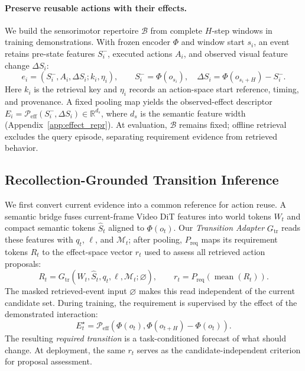 \paragraph{Preserve reusable actions with their effects.}
We build the sensorimotor repertoire $\mathcal B$ from complete $H$-step windows in training demonstrations.
With frozen encoder $\Phi$ and window start $s_i$, an event retains pre-state features $S_i^-$, executed actions $A_i$, and observed visual feature change $\Delta S_i$:
\begin{equation}
 e_i=(S_i^-,A_i,\Delta S_i;k_i,\eta_i),\qquad
 S_i^-=\Phi(o_{s_i}),\quad
 \Delta S_i=\Phi(o_{s_i+H})-S_i^- .
 \label{eq:bank}
\end{equation}
Here $k_i$ is the retrieval key and $\eta_i$ records an action-space start reference, timing, and provenance.
A fixed pooling map yields the observed-effect descriptor $E_i=\mathcal P_{\mathrm{eff}}(S_i^-,\Delta S_i)\in\mathbb R^{d_s}$, where $d_s$ is the semantic feature width (Appendix~\ref{app:effect_repr}).
At evaluation, $\mathcal B$ remains fixed; offline retrieval excludes the query episode, separating requirement evidence from retrieved behavior.

\subsection{Recollection-Grounded Transition Inference}
\label{sec:requirement}

We first convert current evidence into a common reference for action reuse.
A semantic bridge fuses current-frame Video DiT features into world tokens $W_t$ and compact semantic tokens $\widehat S_t$ aligned to $\Phi(o_t)$.
Our \emph{Transition Adapter} $G_{\mathrm{tr}}$ reads these features with $q_t$, $\ell$, and $\mathcal M_t$; after pooling, $P_{\mathrm{req}}$ maps its requirement tokens $R_t$ to the effect-space vector $r_t$ used to assess all retrieved action proposals:
\begin{equation}
 R_t=G_{\mathrm{tr}}(W_t,\widehat S_t,q_t,\ell,\mathcal M_t;\varnothing),
 \qquad r_t=P_{\mathrm{req}}\!\left(\operatorname{mean}(R_t)\right).
 \label{eq:required}
\end{equation}
The masked retrieved-event input $\varnothing$ makes this read independent of the current candidate set.
During training, the requirement is supervised by the effect of the demonstrated interaction:
\begin{equation}
 E_t^\star=\mathcal P_{\mathrm{eff}}\!\left(\Phi(o_t),\Phi(o_{t+H})-\Phi(o_t)\right).
 \label{eq:effect_target}
\end{equation}
The resulting \emph{required transition} is a task-conditioned forecast of what should change. At deployment, the same $r_t$ serves as the candidate-independent criterion for proposal assessment.

